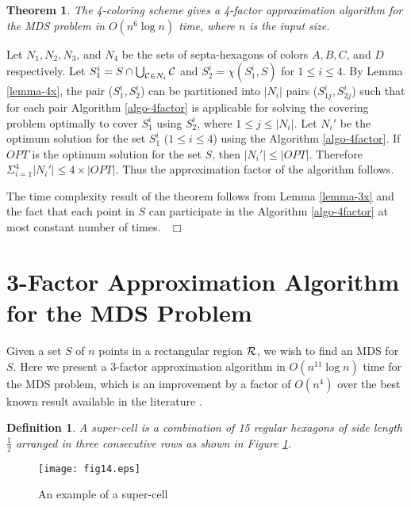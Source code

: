 \documentclass[a4paper,11pt]{article}
\newtheorem{theorem}{Theorem}
\newtheorem{definition}{Definition}
\newenvironment{proof}{\noindent {\bf Proof:\,\ }}{\hfill\mbox{\
$\Box$}\smallskip}
\begin{document}
\begin{theorem} \label{theorem-1y}
The 4-coloring scheme gives a 4-factor approximation algorithm for the MDS problem in $O(n^{6}\log n)$ time, 
where $n$ is the input size.
\end{theorem}

\begin{proof}
Let $N_1, N_2, N_3$, and $N_4$ be the sets of septa-hexagons of colors $A, B, C$, and $D$ respectively. 
Let $S_1^i = S \cap \bigcup_{{\cal C} \in N_i} {\cal C}$ and $S_2^i = \chi(S_1^i, S)$ 
for $1 \leq i \leq 4$. By Lemma 
\ref{lemma-4x}, the pair ($S_1^i, S_2^i$) can be partitioned into $|N_i|$ pairs ($S_{1j}^i, S_{2j}^i$) 
such that for each pair Algorithm \ref{algo-4factor} is applicable for solving the covering problem optimally 
to cover $S_1^i$ using $S_2^i$, where $1 \leq j \leq |N_i|$. Let $N_i'$ be the optimum solution for the set  
$S_1^i$ ($1 \leq i \leq 4$) using the Algorithm \ref{algo-4factor}. If $OPT$ is the optimum solution for the 
set $S$, then $|N_i'| \leq |OPT|$. Therefore $\Sigma_{i=1}^4 |N_i'| \leq 4 \times |OPT|$. Thus the 
approximation factor of the algorithm follows.

The time complexity result of the theorem follows from Lemma \ref{lemma-3x} and the fact that each point in 
$S$ can participate in the Algorithm \ref{algo-4factor} at most constant number of times. 
\end{proof}

\section{3-Factor Approximation Algorithm for the MDS Problem}\label{3factor}
Given a set $S$ of $n$ points in a rectangular region ${\cal R}$, we wish to find an MDS for $S$. 
Here we present a 3-factor approximation algorithm in $O(n^{11} \log n)$ time for the MDS 
problem, which is an improvement by a factor of $O(n^4)$ over the best known result available in 
the literature \cite{DDCN13}. 

\begin{definition}
A {\it super-cell} is a combination of 15 regular hexagons of side length $\frac{1}{2}$ arranged 
in three consecutive rows as shown in Figure \ref{fig:fig14}. 
\end{definition}

\begin{figure}[ht]
\begin{center}
\texttt{[image: fig14.eps]}
\caption{An example of a super-cell}
\label{fig:fig14}
\end{center}
\end{figure}
\end{document}
